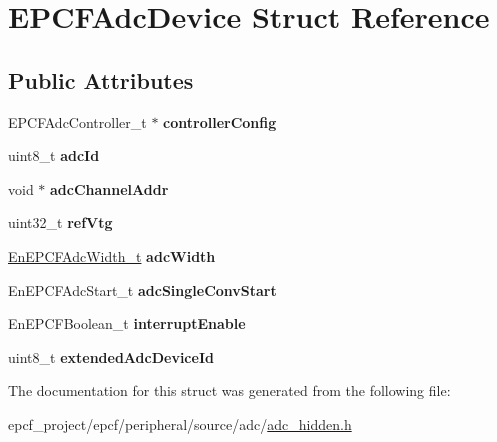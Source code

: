 \hypertarget{structEPCFAdcDevice}{}\section{E\+P\+C\+F\+Adc\+Device Struct Reference}
\label{structEPCFAdcDevice}
\subsection*{Public Attributes}
\begin{DoxyCompactItemize}
\item 
\mbox{\label{structEPCFAdcDevice_adb962a01560740d1a70bd27353e74801}} 
E\+P\+C\+F\+Adc\+Controller\+\_\+t $\ast$ {\bfseries controller\+Config}
\item 
\mbox{\label{structEPCFAdcDevice_aecdaa2fdb8171486907774a8dbb02625}} 
uint8\+\_\+t {\bfseries adc\+Id}
\item 
\mbox{\label{structEPCFAdcDevice_a110f3753d12049bff2e3ae17972581b3}} 
void $\ast$ {\bfseries adc\+Channel\+Addr}
\item 
\mbox{\label{structEPCFAdcDevice_a1ef641e087ae3a3bdd18c63def37a45c}} 
uint32\+\_\+t {\bfseries ref\+Vtg}
\item 
\mbox{\label{structEPCFAdcDevice_a21f88311bb08838d2d16134d2f745897}} 
\mbox{\hyperlink{adc_8h_a95ed8e489525daf80ac43f789951d323}{En\+E\+P\+C\+F\+Adc\+Width\+\_\+t}} {\bfseries adc\+Width}
\item 
\mbox{\label{structEPCFAdcDevice_ac44398280e4941335a11d181ffcfa826}} 
En\+E\+P\+C\+F\+Adc\+Start\+\_\+t {\bfseries adc\+Single\+Conv\+Start}
\item 
\mbox{\label{structEPCFAdcDevice_a5f3a2b22d13eba188b09073404d2008b}} 
En\+E\+P\+C\+F\+Boolean\+\_\+t {\bfseries interrupt\+Enable}
\item 
\mbox{\label{structEPCFAdcDevice_a1f154e1afab3b7041c7b409e14e5edd9}} 
uint8\+\_\+t {\bfseries extended\+Adc\+Device\+Id}
\end{DoxyCompactItemize}


The documentation for this struct was generated from the following file\+:\begin{DoxyCompactItemize}
\item 
epcf\+\_\+project/epcf/peripheral/source/adc/\mbox{\hyperlink{adc__hidden_8h}{adc\+\_\+hidden.\+h}}\end{DoxyCompactItemize}
